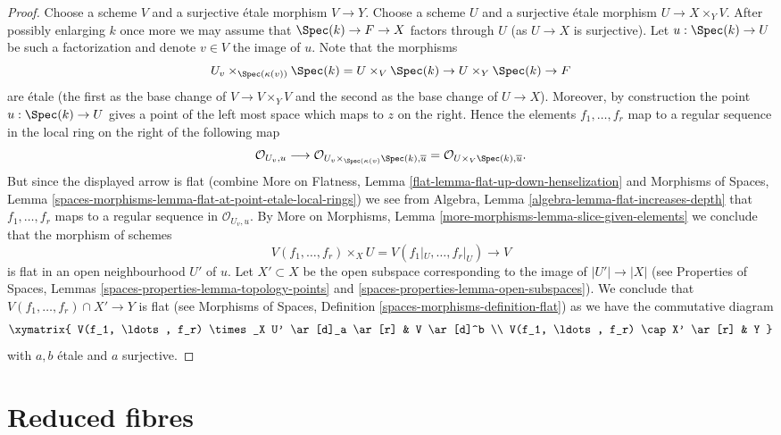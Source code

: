 \begin{proof}
\medskip\noindent
Choose a scheme $V$ and a surjective \'etale morphism
$V \to Y$. Choose a scheme $U$ and a surjective \'etale morphism
$U \to X \times_Y V$. After possibly enlarging $k$ once more we may
assume that $\Spec(k) \to F \to X$ factors through $U$ (as
$U \to X$ is surjective). Let
$u : \Spec(k) \to U$ be such a factorization and denote $v \in V$
the image of $u$. Note that the morphisms
$$
U_v \times_{\Spec(\kappa(v))} \Spec(k) =
U \times_V \Spec(k) \to U \times_Y \Spec(k) \to F
$$
are \'etale (the first as the base change of $V \to V \times_Y V$ and
the second as the base change of $U \to X$). Moreover, by construction
the point $u : \Spec(k) \to U$ gives a point of the left most
space which maps to $z$ on the right. Hence the elements
$f_1, \ldots, f_r$ map to a regular sequence in the local ring
on the right of the following map
$$
\mathcal{O}_{U_v, u}
\longrightarrow
\mathcal{O}_{U_v \times_{\Spec(\kappa(v)} \Spec(k), \overline{u}}
=
\mathcal{O}_{U \times_V \Spec(k), \overline{u}}.
$$
But since the displayed arrow is flat (combine
More on Flatness, Lemma \ref{flat-lemma-flat-up-down-henselization}
and
Morphisms of Spaces,
Lemma \ref{spaces-morphisms-lemma-flat-at-point-etale-local-rings})
we see from
Algebra, Lemma \ref{algebra-lemma-flat-increases-depth}
that $f_1, \ldots, f_r$ maps to a regular sequence in
$\mathcal{O}_{U_v, u}$. By
More on Morphisms, Lemma \ref{more-morphisms-lemma-slice-given-elements}
we conclude that the morphism of schemes
$$
V(f_1, \ldots, f_r) \times_X U = V(f_1|_U, \ldots, f_r|_U) \to V
$$
is flat in an open neighbourhood $U'$ of $u$. Let $X' \subset X$
be the open subspace corresponding to the image of
$|U'| \to |X|$ (see
Properties of Spaces, Lemmas
\ref{spaces-properties-lemma-topology-points} and
\ref{spaces-properties-lemma-open-subspaces}).
We conclude that $V(f_1, \ldots, f_r) \cap X' \to Y$ is flat
(see
Morphisms of Spaces, Definition \ref{spaces-morphisms-definition-flat})
as
we have the commutative diagram
$$
\xymatrix{
V(f_1, \ldots, f_r) \times_X U' \ar[d]_a \ar[r] & V \ar[d]^b \\
V(f_1, \ldots, f_r) \cap X' \ar[r] & Y
}
$$
with $a, b$ \'etale and $a$ surjective.
\end{proof}






\section{Reduced fibres}
\label{section-reduced}

